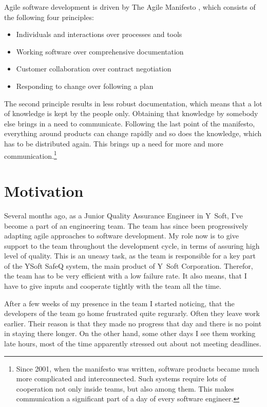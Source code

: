 \documentclass[11pt,singleside]{myfithesis2}
\begin{document}
Agile software development is driven by The Agile Manifesto \cite{agileManifesto}, which consists of the following four principles:
\begin{itemize}
	\item Individuals and interactions over processes and tools
	\item Working software over comprehensive documentation
	\item Customer collaboration over contract negotiation
	\item Responding to change over following a plan 
\end{itemize}
The second principle results in less robust documentation, which means that a lot of knowledge is kept by the people only. Obtaining that knowledge by somebody else brings in a need to communicate. Following the last point of the manifesto, everything around products can change rapidly and so does the knowledge, which has to be distributed again. This brings up a need for more and more communication.\footnote{Since 2001, when the manifesto was written, software products became much more complicated and interconnected. Such systems require lots of cooperation not only inside teams, but also among them. This makes communication a significant part of a day of every software engineer.}


	\section{Motivation}
Several months ago, as a Junior Quality Assurance Engineer in Y~Soft, I've become a part of an engineering team. The team has since been progressively adapting agile approaches to software development. My role now is to give support to the team throughout the development cycle, in terms of assuring high level of quality. This is an uneasy task, as the team is responsible for a key part of the YSoft SafeQ system, the main product of Y~Soft Corporation. Therefor, the team has to be very efficient with a low failure rate. It also means, that I have to give inputs and cooperate tightly with the team all the time. 

After a few weeks of my presence in the team I started noticing, that the developers of the team go home frustrated quite regurarly. Often they leave work earlier. Their reason is that they made no progress that day and there is no point in staying there longer. On the other hand, some other days I see them working late hours, most of the time apparently stressed out about not meeting deadlines.
\end{document}

